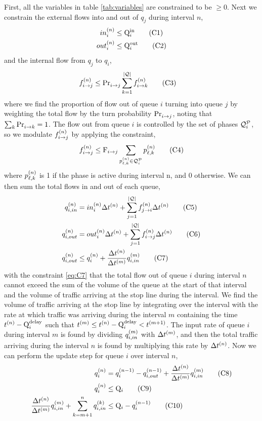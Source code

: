 First, all the variables in table \ref{tab:variables} are constrained to be $\ge
0$. Next we constrain the external flows into and out of $q_j$ during interval
$n$,
%
\begin{align}
\inq{i} &\le \QIN{i} \tag{C1}\label{eq:C1}\\        
\outq{i} &\le \QOUT{i} \tag{C2}\label{eq:C2}
\end{align}
%
and the internal flow from $q_j$ to $q_i$,
%
\begin{align}
\f{i}{j} &\le \FTURN{i}{j} \sum \limits_{k=1}^{\Qn}  \f{i}{k} \tag{C3}\label{eq:C3}
\end{align}
%
where we find the proportion of flow out of queue $i$ turning into queue $j$ by
weighting the total flow by the turn probability $\FTURN{i}{j}$, noting that
$\sum_k \FTURN{i}{k}=1$. The flow out from queue $i$ is controlled by the set of
phases $\QPset{i}$, so we modulate $\f{i}{j}$ by applying the constraint,
%
\begin{align}
\f{i}{j} \le \FMAX{i}{j} \sum \limits_{\p{\ell}{k} \in \QPset{i}} {\p{\ell}{k}} \tag{C4}\label{eq:C4}
\end{align}
%
where $\p{\ell}{k}$ is 1 if the phase is active during interval n, and 0
otherwise. We can then sum the total flows in and out of each queue,
%
\begin{align}
\qin{i} &= \inq{i} \DT + \sum \limits_{j=1}^{\Qn}  \f{j}{i} \DT   \tag{C5}\label{eq:C5} \\
\qout{i} &= \outq{i} \DT + \sum \limits_{j=1}^{\Qn}  \f{i}{j} \DT \tag{C6}\label{eq:C6}\\
\qout{i} &\le \q{i} + \frac{\DT[n]}{\DT[m]}\qin[m]{i}\tag{C7}\label{eq:C7}
\end{align}
%
with the constraint \ref{eq:C7} that the total flow out of queue $i$ during
interval $n$ cannot exceed the sum of the volume of the queue at the start of
that interval and the volume of traffic arriving at the stop line during the
interval. We find the volume of traffic arriving at the stop line by integrating
over the interval with the rate at which traffic was arriving during the
interval $m$ containing the time $\tn - \QDELAY{i}$ such that $\tn[m] \le
\tn-\QDELAY{i} < \tn[m+1]$. The input rate of queue $i$ during interval $m$ is
found by dividing $\qin[m]{i}$ with $\DT[m]$, and then the total traffic
arriving during the interval $n$ is found by multiplying this rate by $\DT$.
Now we can perform the update step for queue $i$ over interval $n$,
%
\begin{align}
\q{i} &= \q[n-1]{i} - \qout[n-1]{i} + \frac{\DT[n]}{\DT[m]}\qin[m]{i} \tag{C8}\label{eq:C8}\\
\q{i} &\le \QMAX{i} \tag{C9}\label{eq:C9}\\
 \frac{\DT[n]}{\DT[m]}\qin[m]{i}  + \sum \limits_{k=m+1}^n \qin[k]{i} &\le \QMAX{i} - \q[n-1]{i}\tag{C10}\label{eq:C10}
\end{align}


